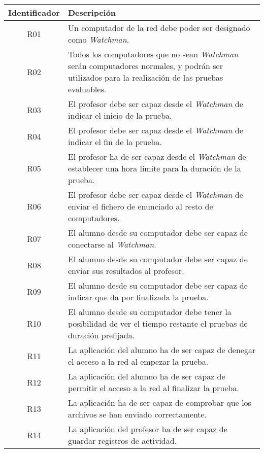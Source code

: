 \begin{tabular}{|c|l|}
    \hline
    \textbf{Identificador} & \textbf{Descripción}
    \\ \hline

    R01 & Un computador de la red debe poder ser designado como \emph{Watchman}.
    \\ \hline

    R02 & Todos los computadores que no sean \emph{Watchman} serán computadores
    normales, y podrán ser utilizados para la realización de las pruebas evaluables.
    \\ \hline

    R03 & El profesor debe ser capaz desde el \emph{Watchman} de indicar el inicio de la prueba.
    \\ \hline

    R04 & El profesor debe ser capaz desde el \emph{Watchman} de indicar el fin de la prueba.
    \\ \hline

    R05 & El profesor ha de ser capaz desde el \emph{Watchman} de establecer una hora límite para la duración de la prueba.
    \\ \hline

    R06 & El profesor debe ser capaz desde el \emph{Watchman} de enviar el fichero de enunciado al resto de computadores.
    \\ \hline

    R07 & El alumno desde su computador debe ser capaz de conectarse al \emph{Watchman}.
    \\ \hline

    R08 & El alumno desde su computador debe ser capaz de enviar sus resultados al profesor.
    \\ \hline

    R09 & El alumno desde su computador debe ser capaz de indicar que da por finalizada la prueba.
    \\ \hline

    R10 & El alumno desde su computador debe tener la posibilidad de ver el tiempo restante el pruebas de duración prefijada.
    \\ \hline

    R11 & La aplicación del alumno ha de ser capaz de denegar el acceso a la red al empezar la prueba.
    \\ \hline

    R12 & La aplicación del alumno ha de ser capaz de permitir el acceso a la red al finalizar la prueba.
    \\ \hline

    R13 & La aplicación ha de ser capaz de comprobar que los archivos se han enviado correctamente.
    \\ \hline

    R14 & La aplicación del profesor ha de ser capaz de guardar registros de actividad.
    \\ \hline

\end{tabular}


